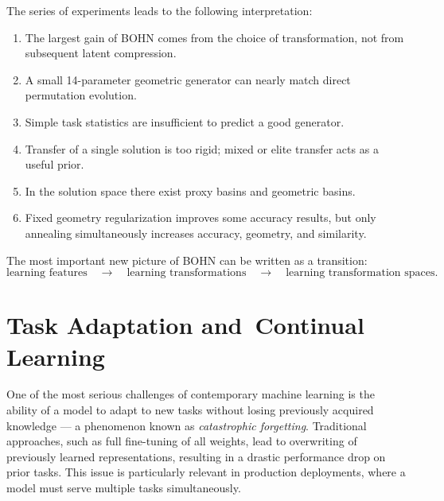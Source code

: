 \documentclass[11pt,a4paper]{report}
\begin{document}
The series of experiments leads to the following interpretation:
\begin{enumerate}[label=(\arabic*)]
  \item The largest gain of BOHN comes from the choice of transformation, not from subsequent latent compression.
  \item A small 14-parameter geometric generator can nearly match direct permutation evolution.
  \item Simple task statistics are insufficient to predict a good generator.
  \item Transfer of a single solution is too rigid; mixed or elite transfer acts as a useful prior.
  \item In the solution space there exist proxy basins and geometric basins.
  \item Fixed geometry regularization improves some accuracy results, but only annealing simultaneously increases accuracy, geometry, and similarity.
\end{enumerate}

The most important new picture of BOHN can be written as a transition:
\[
  \text{learning features}
  \quad\longrightarrow\quad
  \text{learning transformations}
  \quad\longrightarrow\quad
  \text{learning transformation spaces}.
\]

\clearpage





\chapter{Task Adaptation and~Continual Learning}

One of the most serious challenges of contemporary machine learning is the ability of a model to adapt to new tasks without losing previously acquired knowledge --- a phenomenon known as \emph{catastrophic forgetting}. Traditional approaches, such as full fine-tuning of all weights, lead to overwriting of previously learned representations, resulting in a drastic performance drop on prior tasks. This issue is particularly relevant in production deployments, where a model must serve multiple tasks simultaneously.
\end{document}
